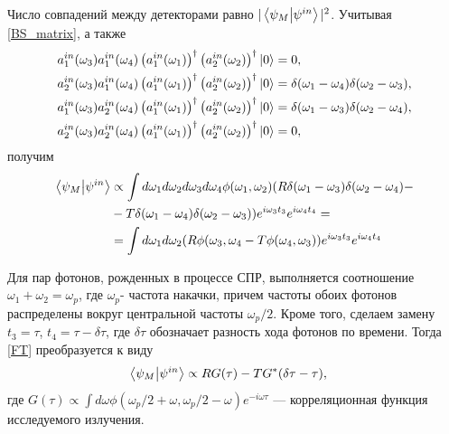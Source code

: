 \documentclass[12pt,a5paper]{article}
\numberwithin{equation}{section}
\begin{document}
Число совпадений между детекторами равно $|\bra{\psi_M}\ket{\psi^{in}}|^2$. Учитывая \ref{BS_matrix}, а также
\begin{equation}
\begin{split}
    &a_1^{in}(\omega_3)a_1^{in}(\omega_4)\left(a_1^{in}(\omega_1) \right)^\dagger \left(a_2^{in}(\omega_2)\right)^\dagger \ket{0} =0, \nonumber\\
    &a_2^{in}(\omega_3)a_1^{in}(\omega_4)\left(a_1^{in}(\omega_1) \right)^\dagger \left(a_2^{in}(\omega_2)\right)^\dagger \ket{0} =\delta(\omega_1-\omega_4) \delta(\omega_2-\omega_3), \nonumber\\
    &a_1^{in}(\omega_3)a_2^{in}(\omega_4)\left(a_1^{in}(\omega_1) \right)^\dagger \left(a_2^{in}(\omega_2)\right)^\dagger \ket{0} =\delta(\omega_1-\omega_3) \delta(\omega_2-\omega_4), \nonumber\\
    &a_2^{in}(\omega_3)a_2^{in}(\omega_4)\left(a_1^{in}(\omega_1) \right)^\dagger \left(a_2^{in}(\omega_2)\right)^\dagger \ket{0} =0,
\label{aax}
\end{split}
\end{equation}
получим
\begin{equation}
\begin{split}
    \bra{\psi_M}\ket{\psi^{in}}& \propto  \int d\omega_1 d\omega_2 d\omega_3 d\omega_4 \phi(\omega_1,\omega_2)
    (R \delta(\omega_1-\omega_3) \delta(\omega_2-\omega_4)- \\
    &-T \delta(\omega_1-\omega_4) \delta(\omega_2-\omega_3))
    e^{i\omega_3 t_3} e^{i\omega_4 t_4}= \\
    &= \int d\omega_1 d\omega_2 (R\phi(\omega_3,\omega_4-T\phi(\omega_4,\omega_3))
    e^{i\omega_3 t_3} e^{i\omega_4 t_4}
\label{FT}
\end{split}
\end{equation}

Для пар фотонов, рожденных в процессе СПР, выполняется соотношение $\omega_1+\omega_2=\omega_p$, где $\omega_p$- частота накачки, причем частоты обоих фотонов распределены вокруг центральной частоты $\omega_p/2$. Кроме того, сделаем замену $t_3=\tau$, $t_4=\tau-\delta\tau$, где $\delta\tau$ обозначает разность хода фотонов по времени. Тогда \ref{FT} преобразуется к виду
\begin{equation}
\begin{split}
    \bra{\psi_M}\ket{\psi^{in}}& \propto R G(\tau)-TG^*(\delta\tau-\tau),
\label{FT2}
\end{split}
\end{equation}
где $G(\tau)\propto \int d\omega \phi(\omega_p/2+\omega, \omega_p/2-\omega) e^{-i\omega\tau}$ --- корреляционная функция исследуемого излучения.
\end{document}
